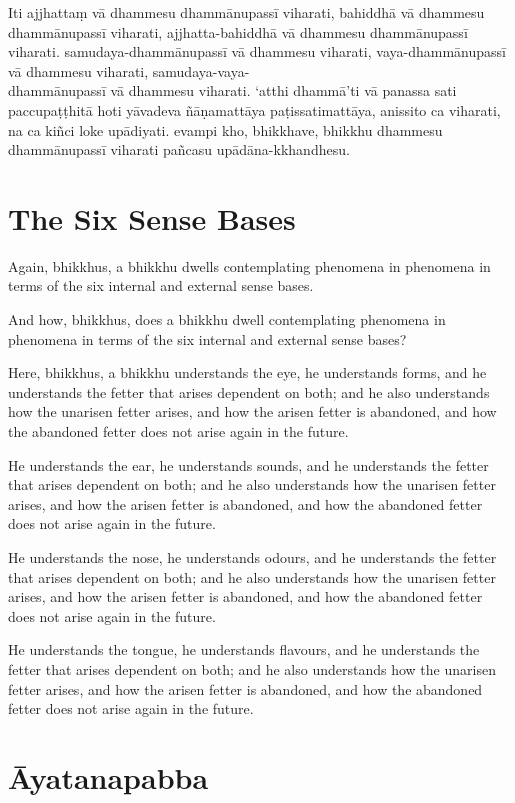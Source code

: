 Iti ajjhattaṃ vā dhammesu dhammānupassī viharati,
bahiddhā vā dhammesu dhammānupassī viharati,
ajjhatta-bahiddhā vā dhammesu dhammānupassī viharati.
samudaya-dhammānupassī vā dhammesu viharati,
vaya-dhammānupassī vā dhammesu viharati,
samudaya-vaya-\\ dhammānupassī vā dhammesu viharati.
‘atthi dhammā’ti vā panassa sati paccupaṭṭhitā hoti
yāvadeva ñāṇamattāya paṭissatimattāya, anissito ca viharati,
na ca kiñci loke upādiyati. evampi kho, bhikkhave, bhikkhu
dhammesu dhammānupassī viharati pañcasu upādāna-kkhandhesu.


\englishPage
\section{The Six Sense Bases}

Again, bhikkhus, a bhikkhu dwells contemplating phenomena in phenomena in terms
of the six internal and external sense bases.

And how, bhikkhus, does a bhikkhu dwell contemplating phenomena in phenomena in
terms of the six internal and external sense bases?

Here, bhikkhus, a bhikkhu understands the eye, he understands forms, and he
understands the fetter that arises dependent on both; and he also understands
how the unarisen fetter arises, and how the arisen fetter is abandoned, and how
the abandoned fetter does not arise again in the future.

He understands the ear, he understands sounds, and he understands the fetter
that arises dependent on both; and he also understands how the unarisen fetter
arises, and how the arisen fetter is abandoned, and how the abandoned fetter
does not arise again in the future.

He understands the nose, he understands odours, and he understands the fetter
that arises dependent on both; and he also understands how the unarisen fetter
arises, and how the arisen fetter is abandoned, and how the abandoned fetter
does not arise again in the future.

He understands the tongue, he understands flavours, and he understands the
fetter that arises dependent on both; and he also understands how the unarisen
fetter arises, and how the arisen fetter is abandoned, and how the abandoned
fetter does not arise again in the future.

\paliPage
\section*{Āyatanapabba}

